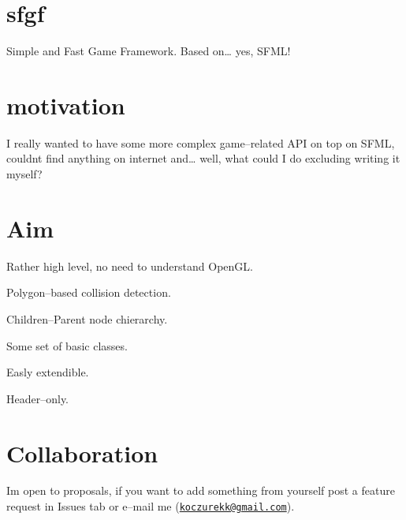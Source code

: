 \hypertarget{index_sfgf}{}\section{sfgf}\label{index_sfgf}
Simple and Fast Game Framework. Based on… yes, S\+F\+M\+L!\hypertarget{index_motivation}{}\section{motivation}\label{index_motivation}
I really wanted to have some more complex game–related A\+PI on top on S\+F\+ML, couldn\textquotesingle{}t find anything on internet and… well, what could I do excluding writing it myself?\hypertarget{index_Aim}{}\section{Aim}\label{index_Aim}

\begin{DoxyItemize}
\item Rather high level, no need to understand Open\+GL.
\item Polygon–based collision detection.
\item Children–\+Parent node chierarchy.
\item Some set of basic classes.
\item Easly extendible.
\item Header–only.
\end{DoxyItemize}\hypertarget{index_Collaboration}{}\section{Collaboration}\label{index_Collaboration}
I\textquotesingle{}m open to proposals, if you want to add something from yourself post a feature request in \textquotesingle{}Issues\textquotesingle{} tab or e–mail me (\href{mailto:koczurekk@gmail.com}{\tt koczurekk@gmail.\+com}). 